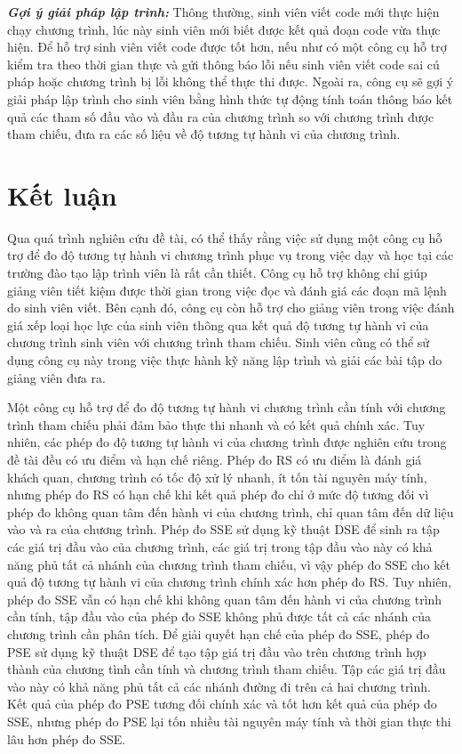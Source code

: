 \textit{\textbf{Gợi ý giải pháp lập trình:}} Thông thường, sinh viên
viết code mới thực hiện chạy chương trình, lúc này sinh viên
mới biết được kết quả đoạn code vừa thực hiện. Để hỗ trợ sinh viên
viết code được tốt hơn, nếu như có một công cụ hỗ trợ kiểm tra theo
thời gian thực và gửi thông báo lỗi nếu sinh viên viết code sai cú
pháp hoặc chương trình bị lỗi không thể thực thi được. Ngoài ra, công
cụ sẽ gợi ý giải pháp lập trình cho sinh viên bằng hình thức tự động
tính toán thông báo kết quả các tham số đầu vào và đầu ra của chương
trình so với chương trình được tham chiếu, đưa ra các số liệu về độ
tương tự hành vi của chương trình.

\section{Kết luận}
Qua quá trình nghiên cứu đề tài, có thể thấy rằng việc sử dụng một 
công cụ hỗ trợ để đo độ tương tự hành vi chương trình phục vụ trong 
việc dạy và học tại các trường đào tạo lập trình viên là rất cần 
thiết. Công cụ hỗ trợ không chỉ giúp giảng viên tiết kiệm được thời 
gian trong việc đọc và đánh giá các đoạn mã lệnh do sinh viên viết. 
Bên cạnh đó, công cụ còn hỗ trợ cho giảng viên trong việc đánh giá 
xếp loại học lực của sinh viên thông qua kết quả độ tương tự hành vi 
của chương trình sinh viên với chương trình tham chiếu. Sinh viên cũng  
có thể sử dụng công cụ này trong việc thực hành kỹ năng lập trình 
và giải các bài tập do giảng viên đưa ra. 

Một công cụ hỗ trợ để đo độ tương tự hành vi chương trình cần tính
với chương trình tham chiếu phải đảm bảo thực thi nhanh và có kết quả 
chính xác. Tuy nhiên, các phép đo độ tương tự hành vi của chương trình 
được nghiên cứu trong đề tài đều có ưu điểm và hạn chế riêng. Phép đo RS có 
ưu điểm là đánh giá khách quan, chương trình có tốc độ xử lý nhanh, ít tốn 
tài nguyên máy tính, nhưng phép đo RS có hạn chế khi kết quả phép đo 
chỉ ở mức độ tương đối vì phép đo không quan tâm đến hành vi 
của chương trình, chỉ quan tâm đến dữ liệu vào và ra của chương trình.
Phép đo SSE sử dụng kỹ thuật DSE để sinh ra tập các giá trị đầu vào của 
chương trình, các giá trị trong tập đầu vào này có khả năng phủ tất cả 
nhánh của chương trình tham chiếu, vì vậy phép đo SSE cho kết quả độ tương 
tự hành vi của chương trình chính xác hơn phép đo RS. Tuy nhiên, phép đo 
SSE vẫn có hạn chế khi không quan tâm đến hành vi của chương trình cần 
tính, tập đầu vào của phép đo SSE không phủ được tất cả các nhánh của 
chương trình cần phân tích. Để giải quyết hạn chế của phép đo SSE, phép đo 
PSE sử dụng kỹ thuật DSE để tạo tập giá trị đầu vào trên chương trình hợp 
thành của chương tình cần tính và chương trình tham chiếu. Tập các giá trị 
đầu vào này có khả năng phủ tất cả các nhánh đường đi trên cả hai chương 
trình. Kết quả của phép đo PSE tương đối chính xác và tốt hơn kết quả của 
phép đo SSE, nhưng phép đo PSE lại tốn nhiều tài nguyên máy tính và thời 
gian thực thi lâu hơn phép đo SSE.

